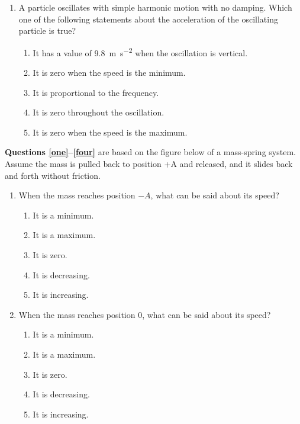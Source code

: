 \documentclass{../../../oss-classkick}
\begin{document}
\begin{multicols}{2}
\begin{enumerate}[leftmargin=18pt]
  \item A particle oscillates with simple harmonic motion with no damping.
    Which one of the following statements about the acceleration of the
    oscillating particle is true?
    \begin{enumerate}[nosep,leftmargin=18pt,label=(\Alph*)]
    \item It has a value of \SI{9.8}{\metre\per\second\squared} when the
      oscillation is vertical.
    \item It is zero when the speed is the minimum.
    \item It is proportional to the frequency.
    \item It is zero throughout the oscillation.
    \item It is zero when the speed is the maximum.
    \end{enumerate}
  \end{enumerate}
  
  \textbf{Questions \ref{one}--\ref{four}} are based on the figure below of a
  mass-spring system. Assume the mass is pulled back to position +A and
  released, and it slides back and forth without friction.
  \begin{center}
  \end{center}
  \begin{enumerate}[leftmargin=18pt,resume]
  \item When the mass reaches position $-A$, what can be said about its speed?
    \label{one}
    \begin{enumerate}[nosep,leftmargin=18pt,label=(\Alph*)]
    \item It is a minimum.
    \item It is a maximum.
    \item It is zero.
    \item It is decreasing.
    \item It is increasing.
    \end{enumerate}
    \vspace{.7in}
    
  \item When the mass reaches position 0, what can be said about its speed?
    \begin{enumerate}[nosep,leftmargin=18pt,label=(\Alph*)]
    \item It is a minimum.
    \item It is a maximum.
    \item It is zero.
    \item It is decreasing.
    \item It is increasing.
    \end{enumerate}
    \vspace{.7in}
    

\end{enumerate}
\end{multicols}
\end{document}
